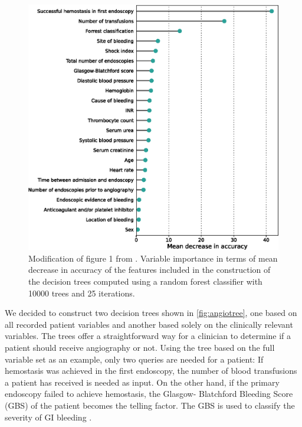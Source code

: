 \begin{figure}[b!]
\centering
\includegraphics[width=\textwidth]{04_GraphicFiles/03_angio_forest.eps}
\caption{Modification of figure 1 from \citet{Werner2021}. Variable importance
  in terms of mean decrease in accuracy of the features included in the   
  construction of the decision trees computed using a random forest
  classifier with \num{10000} trees and \num{25} iterations.}
\label{fig:angioforest}
\end{figure}

We decided to construct two decision trees shown in \cref{fig:angiotree}, one
based on all recorded patient variables and another based solely on the
clinically relevant variables. The trees offer a straightforward way for a
clinician to determine if a patient should receive angiography or not. Using
the tree based on the full variable set as an example, only two queries are
needed for a patient: If hemostasis was achieved in the first endoscopy, the
number of blood transfusions a patient has received is needed as input. On the
other hand, if the primary endoscopy failed to achieve hemostasis, the Glasgow-
Blatchford Bleeding Score (GBS) of the patient becomes the telling factor. The
GBS is used to classify the severity of GI bleeding \citep{Laursen2015}.
\pagebreak


